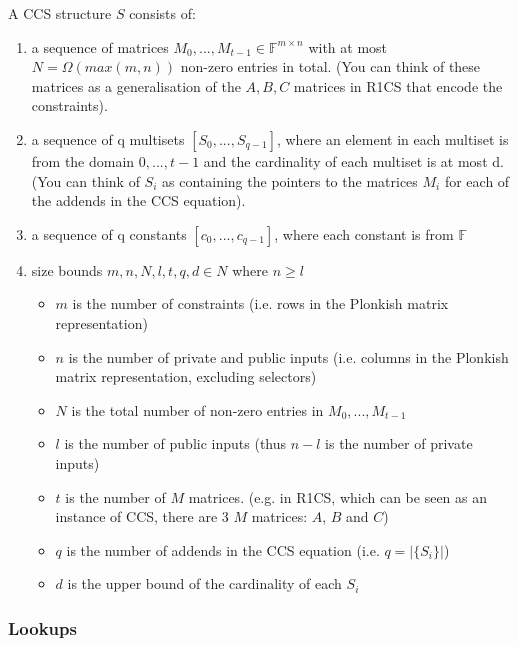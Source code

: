 \documentclass[
    9pt,            %
    techreport,        %
    affiltop,       %
]{art}
\begin{document}
\begin{definition}[CCS]
    A CCS structure $S$ consists of: 
    \begin{enumerate}
        \item a sequence of matrices $M_0,..., M_{t-1} \in \mathbb{F}^{m\times n}$ with at most $N = \Omega(max(m, n))$ non-zero entries in total. (You can think of these matrices as a generalisation of the $A,B,C$ matrices in R1CS that encode the constraints).
        \item a sequence of q multisets $[S_0,...,S_{q-1}]$, where an element in each multiset is from the domain ${0,..., t-1}$ and the cardinality of each multiset is at most d. (You can think of $S_i$ as containing the pointers to the matrices $M_i$ for each of the addends in the CCS equation).
        \item a sequence of q constants $[c_0,...,c_{q-1}]$, where each constant is from $\mathbb{F}$
        \item size bounds $m, n, N, l, t, q, d \in N$ where $n \ge l$
        \begin{itemize}
            \item $m$ is the number of constraints (i.e. rows in the Plonkish matrix representation)
            \item $n$ is the number of private and public inputs (i.e. columns in the Plonkish matrix representation, excluding selectors)
            \item $N$ is the total number of non-zero entries in $M_0,...,M_{t-1}$
            \item $l$ is the number of public inputs (thus $n-l$ is the number of private inputs)
            \item $t$ is the number of $M$ matrices. (e.g. in R1CS, which can be seen as an instance of CCS, there are 3 $M$ matrices: $A$, $B$ and $C$)
            \item $q$ is the number of addends in the CCS equation (i.e. $q = |\{S_i\}|$)
            \item $d$ is the upper bound of the cardinality of each $S_i$
        \end{itemize}
    \end{enumerate} 
\end{definition}



\subsubsection{Lookups}
\end{document}
